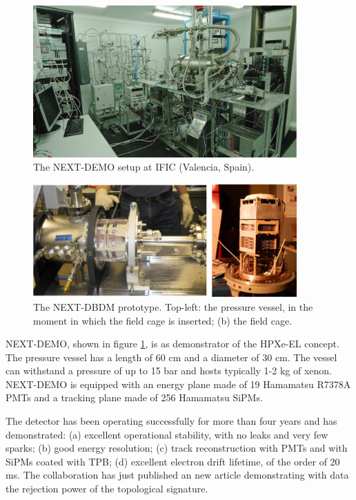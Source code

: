 \begin{figure}
\centering
\includegraphics[width=0.9\textwidth]{img2/DemoSetup.png}
\caption{\small The NEXT-DEMO setup at IFIC (Valencia, Spain).} \label{fig.DEMO}
\end{figure}
%
\begin{figure}
\centering
\includegraphics[width=0.9\textwidth]{img2/DBDM.png}
\caption{\small The NEXT-DBDM prototype. Top-left: the pressure vessel, in the moment in which the field cage is inserted; (b) the field cage.} \label{fig.DBDM}
\end{figure}

NEXT-DEMO, shown in figure \ref{fig.DEMO}, is as demonstrator of the HPXe-EL concept. The pressure vessel has a length of 60 cm and a diameter of 30 cm. The vessel can withstand a pressure of up to 15 bar and hosts typically 1-2 kg of xenon. NEXT-DEMO is  equipped with an energy plane made of 19 Hamamatsu R7378A PMTs and a tracking plane made of 256 Hamamatsu SiPMs. 

The detector has been operating successfully for more than four years and has demonstrated: (a) excellent operational stability, with no leaks and very few sparks; (b) good energy resolution; (c) track reconstruction with PMTs and with SiPMs coated with TPB; (d) excellent electron drift lifetime, of the order of 20 ms\cite{Alvarez:2012xda,Alvarez:2013gxa,Alvarez:2012hu}. The collaboration has just published an new article demonstrating with data the rejection power of the topological signature\cite{PFerrario:2015ina}.


